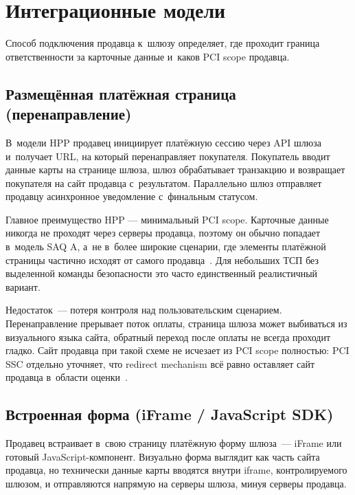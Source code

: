 \section{Интеграционные модели}\label{sec:gw-integration}

Способ подключения продавца к~шлюзу определяет, где
проходит граница ответственности за карточные данные и~каков
PCI scope продавца.

\subsection*{Размещённая платёжная страница (перенаправление)}

В~модели HPP продавец инициирует платёжную сессию через API шлюза
и~получает URL, на который перенаправляет покупателя. Покупатель
вводит данные карты на странице шлюза, шлюз обрабатывает транзакцию
и возвращает покупателя на сайт продавца с~результатом. Параллельно
шлюз отправляет продавцу асинхронное уведомление с~финальным
статусом.

Главное преимущество HPP --- минимальный PCI scope. Карточные
данные никогда не проходят через серверы продавца, поэтому
он обычно попадает в~модель SAQ A, а~не в~более широкие
сценарии, где элементы платёжной страницы частично исходят
от самого продавца~\cite{pci-faq-1291,pci-faq-1293}. Для небольших
ТСП без выделенной команды безопасности это часто
единственный реалистичный вариант.

Недостаток~--- потеря контроля над пользовательским сценарием.
Перенаправление прерывает поток оплаты, страница шлюза может
выбиваться из визуального языка сайта, обратный переход
после оплаты не всегда проходит гладко. Сайт
продавца при такой схеме не исчезает из PCI scope полностью:
PCI SSC отдельно уточняет, что redirect mechanism всё равно
оставляет сайт продавца в~области оценки~\cite{pci-faq-1332}.

\subsection*{Встроенная форма (iFrame / JavaScript SDK)}

Продавец встраивает в~свою страницу платёжную форму шлюза~---
iFrame или готовый JavaScript-компонент.
Визуально форма выглядит как часть сайта продавца, но технически
данные карты вводятся внутри iframe, контролируемого шлюзом,
и отправляются напрямую на серверы шлюза, минуя серверы продавца.

